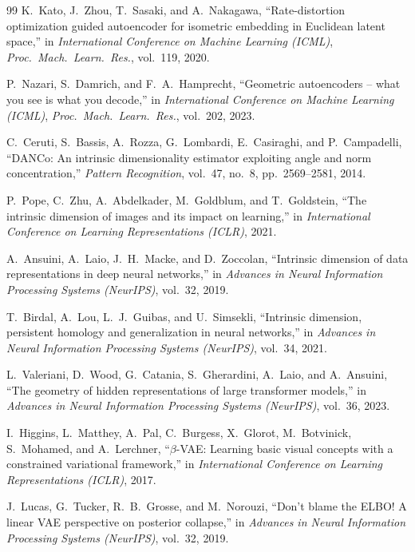 \documentclass[12pt,a4paper]{article}
\begin{document}
\begin{thebibliography}{99}
K.~Kato, J.~Zhou, T.~Sasaki, and A.~Nakagawa,
``Rate-distortion optimization guided autoencoder for isometric embedding in Euclidean latent space,''
in \textit{International Conference on Machine Learning (ICML)},
\textit{Proc.~Mach.~Learn.~Res.}, vol.~119, 2020.

P.~Nazari, S.~Damrich, and F.~A.~Hamprecht,
``Geometric autoencoders -- what you see is what you decode,''
in \textit{International Conference on Machine Learning (ICML)},
\textit{Proc.~Mach.~Learn.~Res.}, vol.~202, 2023.

C.~Ceruti, S.~Bassis, A.~Rozza, G.~Lombardi, E.~Casiraghi, and P.~Campadelli,
``DANCo: An intrinsic dimensionality estimator exploiting angle and norm concentration,''
\textit{Pattern Recognition}, vol.~47, no.~8, pp.~2569--2581, 2014.

P.~Pope, C.~Zhu, A.~Abdelkader, M.~Goldblum, and T.~Goldstein,
``The intrinsic dimension of images and its impact on learning,''
in \textit{International Conference on Learning Representations (ICLR)}, 2021.

A.~Ansuini, A.~Laio, J.~H.~Macke, and D.~Zoccolan,
``Intrinsic dimension of data representations in deep neural networks,''
in \textit{Advances in Neural Information Processing Systems (NeurIPS)},
vol.~32, 2019.

T.~Birdal, A.~Lou, L.~J.~Guibas, and U.~Simsekli,
``Intrinsic dimension, persistent homology and generalization in neural networks,''
in \textit{Advances in Neural Information Processing Systems (NeurIPS)},
vol.~34, 2021.

L.~Valeriani, D.~Wood, G.~Catania, S.~Gherardini, A.~Laio, and A.~Ansuini,
``The geometry of hidden representations of large transformer models,''
in \textit{Advances in Neural Information Processing Systems (NeurIPS)},
vol.~36, 2023.

I.~Higgins, L.~Matthey, A.~Pal, C.~Burgess, X.~Glorot, M.~Botvinick,
S.~Mohamed, and A.~Lerchner,
``$\beta$-VAE: Learning basic visual concepts with a constrained variational framework,''
in \textit{International Conference on Learning Representations (ICLR)}, 2017.

J.~Lucas, G.~Tucker, R.~B.~Grosse, and M.~Norouzi,
``Don't blame the ELBO! A linear VAE perspective on posterior collapse,''
in \textit{Advances in Neural Information Processing Systems (NeurIPS)}, vol.~32, 2019.


\end{thebibliography}
\end{document}
